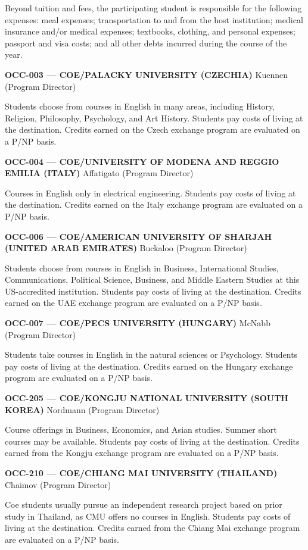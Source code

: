 \documentclass[
  letterpaper,
]{scrbook}
\begin{document}
Beyond tuition and fees, the participating student is responsible for
the following expenses: meal expenses; transportation to and from the
host institution; medical insurance and/or medical expenses; textbooks,
clothing, and personal expenses; passport and visa costs; and all other
debts incurred during the course of the year.

\textbf{OCC-003 --- COE/PALACKY UNIVERSITY (CZECHIA)} Kuennen (Program
Director)

Students choose from courses in English in many areas, including
History, Religion, Philosophy, Psychology, and Art History. Students pay
costs of living at the destination. Credits earned on the Czech exchange
program are evaluated on a P/NP basis.

\textbf{OCC-004 --- COE/UNIVERSITY OF MODENA AND REGGIO EMILIA (ITALY)}
Affatigato (Program Director)

Courses in English only in electrical engineering. Students pay costs of
living at the destination. Credits earned on the Italy exchange program
are evaluated on a P/NP basis.

\textbf{OCC-006 --- COE/AMERICAN UNIVERSITY OF SHARJAH (UNITED ARAB
EMIRATES)} Buckaloo (Program Director)

Students choose from courses in English in Business, International
Studies, Communications, Political Science, Business, and Middle Eastern
Studies at this US-accredited institution. Students pay costs of living
at the destination. Credits earned on the UAE exchange program are
evaluated on a P/NP basis.

\textbf{OCC-007 --- COE/PECS UNIVERSITY (HUNGARY)} McNabb (Program
Director)

Students take courses in English in the natural sciences or Psychology.
Students pay costs of living at the destination. Credits earned on the
Hungary exchange program are evaluated on a P/NP basis.

\textbf{OCC-205 --- COE/KONGJU NATIONAL UNIVERSITY (SOUTH KOREA)}
Nordmann (Program Director)

Course offerings in Business, Economics, and Asian studies. Summer short
courses may be available. Students pay costs of living at the
destination. Credits earned from the Kongju exchange program are
evaluated on a P/NP basis.

\textbf{OCC-210 --- COE/CHIANG MAI UNIVERSITY (THAILAND)} Chaimov
(Program Director)

Coe students usually pursue an independent research project based on
prior study in Thailand, as CMU offers no courses in English. Students
pay costs of living at the destination. Credits earned from the Chiang
Mai exchange program are evaluated on a P/NP basis.
\end{document}
